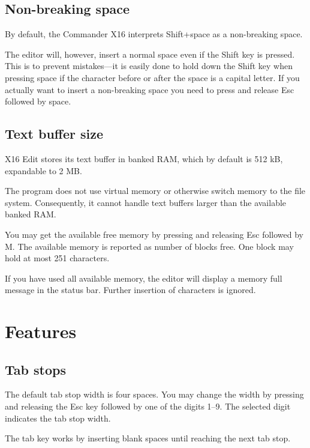\documentclass{article}
\begin{document}
	\subsection{Non-breaking space}

        By default, the Commander X16 interprets Shift+space as a non-breaking space. 
        
        The editor will, however, insert a normal space even if the Shift key is pressed. This is to prevent 
        mistakes---it is easily done to hold down the 
        Shift key when pressing space if the character before or after the space is a capital letter.
        If you actually want to insert a non-breaking space you need to press and release Esc followed
        by space.

    \subsection{Text buffer size}

        X16 Edit stores its text buffer in banked RAM, which by default is 512 kB,
        expandable to 2 MB. 
        
        The program does not use virtual memory or otherwise
        switch memory to the file system. Consequently, it cannot handle text
        buffers larger than the available banked RAM.

        You may get the available free memory by pressing and releasing Esc followed
        by M. The available memory is reported as number of blocks free. One block
        may hold at most 251 characters.

        If you have used all available memory, the editor will display a memory
        full message in the status bar. Further insertion of characters is ignored.

\section{Features}

    \subsection{Tab stops}

        The default tab stop width is four spaces. You may change the width by pressing and releasing the Esc key followed
        by one of the digits 1--9. The selected digit indicates the tab stop width.
        
        The tab key works by inserting blank spaces until reaching the next tab stop.
\end{document}
